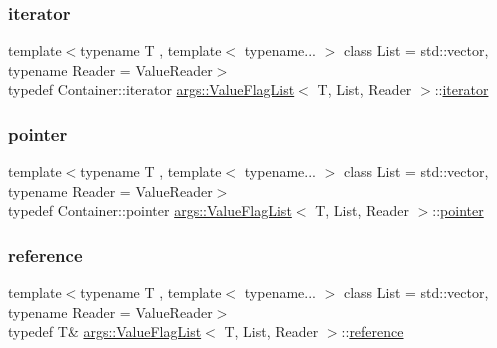 \subsubsection{\texorpdfstring{iterator}{iterator}}
{\footnotesize\ttfamily template$<$typename T , template$<$ typename... $>$ class List = std\+::vector, typename Reader  = Value\+Reader$>$ \\
typedef Container\+::iterator \hyperlink{classargs_1_1_value_flag_list}{args\+::\+Value\+Flag\+List}$<$ T, List, Reader $>$\+::\hyperlink{classargs_1_1_value_flag_list_a4374b7a70c21c42d72912ec5ce323515}{iterator}}

\mbox{\label{classargs_1_1_value_flag_list_a2b2173608ca79983bc81737bfa5e8db2}} 
\subsubsection{\texorpdfstring{pointer}{pointer}}
{\footnotesize\ttfamily template$<$typename T , template$<$ typename... $>$ class List = std\+::vector, typename Reader  = Value\+Reader$>$ \\
typedef Container\+::pointer \hyperlink{classargs_1_1_value_flag_list}{args\+::\+Value\+Flag\+List}$<$ T, List, Reader $>$\+::\hyperlink{classargs_1_1_value_flag_list_a2b2173608ca79983bc81737bfa5e8db2}{pointer}}

\mbox{\label{classargs_1_1_value_flag_list_a4c385ba3155d615adf56db2b23884531}} 
\subsubsection{\texorpdfstring{reference}{reference}}
{\footnotesize\ttfamily template$<$typename T , template$<$ typename... $>$ class List = std\+::vector, typename Reader  = Value\+Reader$>$ \\
typedef T\& \hyperlink{classargs_1_1_value_flag_list}{args\+::\+Value\+Flag\+List}$<$ T, List, Reader $>$\+::\hyperlink{classargs_1_1_value_flag_list_a4c385ba3155d615adf56db2b23884531}{reference}}

\mbox{\label{classargs_1_1_value_flag_list_a8d7e5e66818cba8579caaa0d2d59324a}} 
